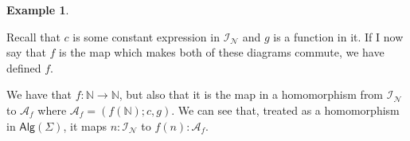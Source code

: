 \documentclass{amsart}
\theoremstyle{definition}
\newtheorem{example}[thm]{Example}
\newcommand{\nn}{\mathbb N} %
\newcommand{\ca}{\mathcal A} %
\newcommand{\cat}[1]{\mathsf{#1}} %
\begin{document}
\begin{example}
\begin{figure}[ht]
\begin{minipage}[b]{0.4\linewidth}
\begin{center}
\end{center}
\end{minipage}
\begin{minipage}[b]{0.4\linewidth}
\begin{center}
\end{center}
\end{minipage}
\end{figure}

Recall that $c$ is some constant expression in $\mathcal I_{\mathcal N}$ and $g$ is a function in it. If I now say that $f$ is the map which makes both of these diagrams commute, we have defined $f$. 

We have that $f : \nn \to \nn$, but also that it is the map in a homomorphism from $\mathcal I_{\mathcal N}$ to $\ca_f$ where $\ca_f = (f(\nn); c, g)$. We can see that, treated as a homomorphism in $\cat{Alg}(\Sigma)$, it maps $n : \mathcal I_{\mathcal N}$ to $f(n) : \ca_f$.
\end{example}
\end{document}
